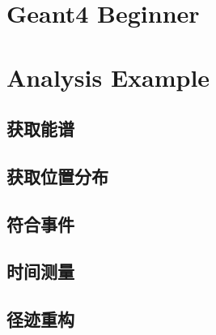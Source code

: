 \documentclass{article}
\begin{document}
\section{Geant4 Beginner}




\section{Analysis Example}
\subsection{获取能谱}
\subsection{获取位置分布}
\subsection{符合事件}
\subsection{时间测量}
\subsection{径迹重构}
\end{document}

